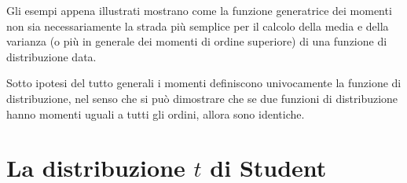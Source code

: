 Gli esempi appena illustrati mostrano come la funzione generatrice dei momenti
non sia necessariamente la strada più semplice per il calcolo della media
e della varianza (o più in generale dei momenti di ordine superiore) di una
funzione di distribuzione data.

Sotto ipotesi del tutto generali i momenti definiscono univocamente la
funzione di distribuzione, nel senso che si può dimostrare che se due
funzioni di distribuzione hanno momenti uguali a tutti gli ordini, allora
sono identiche. 


\section{La distribuzione $t$ di Student}


\summary
